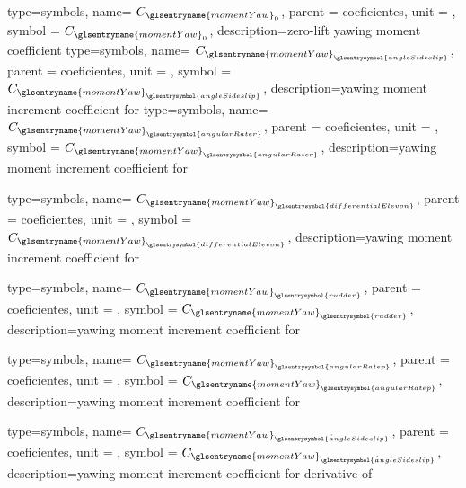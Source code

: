 {type=symbols,
    name= \ensuremath{C_{\glsentryname{momentYaw}_{0}}},
    parent = {coeficientes},
    unit = \unexpanded{},
    symbol = \ensuremath{C_{\glsentryname{momentYaw}_{0}}},
    description={zero-lift yawing moment coefficient}
}
{type=symbols,
    name= \ensuremath{C_{{\glsentryname{momentYaw}}_{\glsentrysymbol{angleSideslip}}}},
    parent = {coeficientes},
    unit = \unexpanded{},
    symbol = \ensuremath{C_{{\glsentryname{momentYaw}}_{\glsentrysymbol{angleSideslip}}}},
    description={yawing moment increment coefficient for }
}
{type=symbols,
    name= \ensuremath{C_{{\glsentryname{momentYaw}}_{\glsentrysymbol{angularRater}}}},
    parent = {coeficientes},
    unit = \unexpanded{},
    symbol = \ensuremath{C_{{\glsentryname{momentYaw}}_{\glsentrysymbol{angularRater}}}},
    description={yawing moment increment coefficient for }
}

{type=symbols,
    name= \ensuremath{C_{{\glsentryname{momentYaw}}_{\glsentrysymbol{differentialElevon}}}},
    parent = {coeficientes},
    unit = \unexpanded{},
    symbol = \ensuremath{C_{{\glsentryname{momentYaw}}_{\glsentrysymbol{differentialElevon}}}},
    description={yawing moment increment coefficient for }
}

{type=symbols,
    name= \ensuremath{C_{{\glsentryname{momentYaw}}_{\glsentrysymbol{rudder}}}},
    parent = {coeficientes},
    unit = \unexpanded{},
    symbol = \ensuremath{C_{{\glsentryname{momentYaw}}_{\glsentrysymbol{rudder}}}},
    description={yawing moment increment coefficient for }
}

{type=symbols,
    name= \ensuremath{C_{{\glsentryname{momentYaw}}_{\glsentrysymbol{angularRatep}}}},
    parent = {coeficientes},
    unit = \unexpanded{},
    symbol = \ensuremath{C_{{\glsentryname{momentYaw}}_{\glsentrysymbol{angularRatep}}}},
    description={yawing moment increment coefficient for }
}

{type=symbols,
    name= \ensuremath{C_{{\glsentryname{momentYaw}}_{\dot{\glsentrysymbol{angleSideslip}}}}},
    parent = {coeficientes},
    unit = \unexpanded{},
    symbol = \ensuremath{C_{{\glsentryname{momentYaw}}_{\dot{\glsentrysymbol{angleSideslip}}}}},
    description={yawing moment increment coefficient for derivative of }
}

